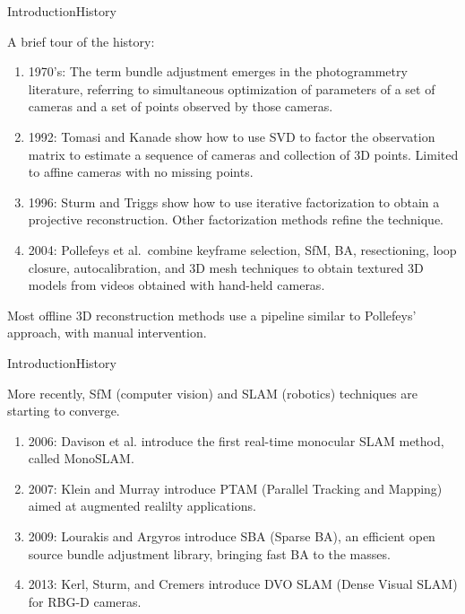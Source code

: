 \documentclass[aspectratio=169]{beamer}
\begin{document}
\begin{frame}{Introduction}{History}

  A brief tour of the history:
  \begin{enumerate}
    \item 1970's: The term \alert{bundle adjustment} emerges in the
      photogrammetry literature, referring to simultaneous
      optimization of parameters of a set of cameras and a set of
      points observed by those cameras.
    \item 1992: Tomasi and Kanade show how to use SVD to factor the
      observation matrix to estimate a sequence of cameras and
      collection of 3D points.  Limited to affine cameras with no
      missing points.
    \item 1996: Sturm and Triggs show how to use iterative
      factorization to obtain a projective reconstruction. Other
      factorization methods refine the technique.
    \item 2004: Pollefeys et al.\ combine keyframe selection, SfM, BA,
      resectioning, loop closure, autocalibration, and 3D mesh
      techniques to obtain textured 3D models from videos obtained
      with hand-held cameras.
  \end{enumerate}

  Most offline 3D reconstruction methods use a pipeline similar to
  Pollefeys' approach, with manual intervention.

\end{frame}


\begin{frame}{Introduction}{History}

  More recently, SfM (computer vision) and SLAM (robotics) techniques
  are starting to converge.

  \begin{enumerate}
    \item 2006: Davison et al. introduce the first real-time monocular
      SLAM method, called \alert{MonoSLAM}.
    \item 2007: Klein and Murray introduce \alert{PTAM} (Parallel
      Tracking and Mapping) aimed at augmented realilty applications.
    \item 2009: Lourakis and Argyros introduce \alert{SBA} (Sparse
      BA), an efficient open source bundle adjustment library,
      bringing fast BA to the masses.
    \item 2013: Kerl, Sturm, and Cremers introduce \alert{DVO SLAM}
      (Dense Visual SLAM) for RBG-D cameras.
  \end{enumerate}

\end{frame}
\end{document}
